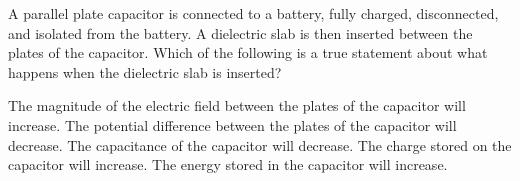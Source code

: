 
\begin{questions}
\setcounter{question}{13}

\question
A parallel plate capacitor is connected to a battery, fully charged, disconnected, and isolated from the battery. A dielectric slab is then inserted between the plates of the capacitor. Which of the following is a true statement about what happens when the dielectric slab is inserted?

\begin{choices}
    \choice The magnitude of the electric field between the plates of the capacitor will increase.
    \choice The potential difference between the plates of the capacitor will decrease.
    \choice The capacitance of the capacitor will decrease.
    \choice The charge stored on the capacitor will increase.
    \choice The energy stored in the capacitor will increase.
\end{choices}

\end{questions}
